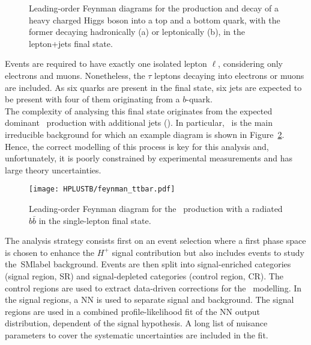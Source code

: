 \begin{figure}[htbp]
    \RawFloats
    \begin{center}
     \quad
    \caption{
        Leading-order Feynman diagrams for the production and decay of a heavy charged Higgs boson into a top and a bottom quark, with the former decaying hadronically (a) or leptonically (b), in the lepton+jets final state.
    }
    \label{Hplustb:feynman2}
    \end{center}
\end{figure}

Events are required to have exactly one isolated lepton $\ell$, considering only electrons and muons. Nonetheless, the $\tau$ leptons decaying into electrons or muons are included. As six quarks are present in the final state, six jets are expected to be present with four of them originating from a $b$-quark.\\

The complexity of analysing this final state originates from the expected dominant \ttbar\ production with additional jets (\ttjets). In particular, \ttb\ is the main irreducible background for which an example diagram is shown in Figure~\ref{Hplustb:feynman3}. Hence, the correct modelling of this process is key for this analysis and, unfortunately, it is poorly constrained by experimental measurements and has large theory uncertainties.\\


\begin{figure}[htbp]
    \RawFloats
    \begin{center}
    \texttt{[image: HPLUSTB/feynman\_ttbar.pdf]}
    \caption{
        Leading-order Feynman diagram for the \ttbar\ production with a radiated $b\bar{b}$ in the single-lepton final state.
    }
    \label{Hplustb:feynman3}
    \end{center}
\end{figure}

The analysis strategy consists first on an event selection where a first phase space is chosen to enhance the $H^+$ signal contribution but also includes events to study the~\acrshort{SMlabel} background. Events are then split into signal-enriched categories (signal region, SR) and signal-depleted categories (control region, CR). The control regions are used to extract data-driven corrections for the \ttbar\ modelling. In the signal regions, a NN is used to separate signal and background. The signal regions are used in a combined profile-likelihood fit of the NN output distribution, dependent of the signal hypothesis. A long list of nuisance parameters to cover the systematic uncertainties are included in the fit.

